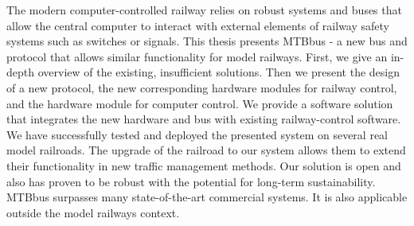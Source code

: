 The modern computer-controlled railway relies on robust systems and
buses that allow the central computer to interact with external elements of
railway safety systems such as switches or signals. This thesis presents MTBbus
- a new bus and protocol that allows similar functionality for model railways.
First, we give an in-depth overview of the existing, insufficient solutions.
Then we present the design of a new protocol, the new corresponding hardware
modules for railway control, and the hardware module for computer control. We
provide a software solution that integrates the new hardware and bus with
existing railway-control software. We have successfully tested and deployed
the presented system on several real model railroads. The upgrade of the
railroad to our system allows them to extend their functionality in new traffic
management methods. Our solution is open and also has proven to be robust with
the potential for long-term sustainability. MTBbus surpasses many
state-of-the-art commercial systems. It is also applicable outside the model
railways context.
